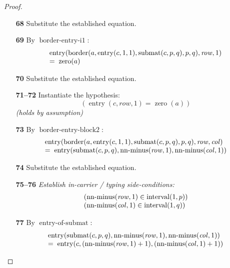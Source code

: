 \documentclass[11pt]{article}
\theoremstyle{plain}
\begin{document}
\begin{proof}
\begin{itemize}[leftmargin=2.8em, itemsep=4pt, parsep=1pt]
  \item[\textbf{68}] Substitute the established equation.
  \item[\textbf{69}] By $\operatorname{border\text{-}entry\text{-}i1}$:
\begin{equation*}
\begin{array}{@{}l@{}} \operatorname{entry}(\operatorname{border}(a, \operatorname{entry}(c, 1, 1), \operatorname{submat}(c, p, q), p, q), \mathit{row}, 1) \\ =\; \operatorname{zero}(a) \end{array}
\end{equation*}

  \item[\textbf{70}] Substitute the established equation.
  \item[\textbf{71--72}] Instantiate the hypothesis:
\begin{equation*}
(\operatorname{entry}(c, \mathit{row}, 1) = \operatorname{zero}(a))
\end{equation*}
  \emph{(holds by assumption)}
  \item[\textbf{73}] By $\operatorname{border\text{-}entry\text{-}block2}$:
\begin{equation*}
\begin{array}{@{}l@{}} \operatorname{entry}(\operatorname{border}(a, \operatorname{entry}(c, 1, 1), \operatorname{submat}(c, p, q), p, q), \mathit{row}, \mathit{col}) \\ =\; \operatorname{entry}(\operatorname{submat}(c, p, q), \operatorname{nn\text{-}minus}(\mathit{row}, 1), \operatorname{nn\text{-}minus}(\mathit{col}, 1)) \end{array}
\end{equation*}

  \item[\textbf{74}] Substitute the established equation.
  \item[\textbf{75--76}] \emph{Establish in-carrier / typing side-conditions:}
\begin{equation*}
\begin{array}{@{}l@{}}
(\operatorname{nn\text{-}minus}(\mathit{row}, 1) \in \operatorname{interval}(1, p)) \\
(\operatorname{nn\text{-}minus}(\mathit{col}, 1) \in \operatorname{interval}(1, q))
\end{array}
\end{equation*}

  \item[\textbf{77}] By $\operatorname{entry\text{-}of\text{-}submat}$:
\begin{equation*}
\begin{array}{@{}l@{}} \operatorname{entry}(\operatorname{submat}(c, p, q), \operatorname{nn\text{-}minus}(\mathit{row}, 1), \operatorname{nn\text{-}minus}(\mathit{col}, 1)) \\ =\; \operatorname{entry}(c, (\operatorname{nn\text{-}minus}(\mathit{row}, 1) + 1), (\operatorname{nn\text{-}minus}(\mathit{col}, 1) + 1)) \end{array}
\end{equation*}


\end{itemize}
\end{proof}
\end{document}
